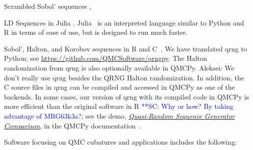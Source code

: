\documentclass[graybox,footinfo]{svmult}
\newcommand{\scnote}[1]{ {\textcolor{blue}  {\mbox{**SC:} #1}}}
\newcommand{\AGSComment}[1]{{\color{cyan} Aleksei: #1}}
\begin{document}
\begin{description}[format=\textup,format=\textbf]
	\item[PyTorch] Scrambled Sobol' sequences \cite{PyTorch},
	\item[QMC.jl] LD Sequences in Julia \cite{Rob20a}. Julia~\cite{bezanson2012julia} is an interpreted language similar to Python and R in terms of ease of use, but is designed to run much faster.
	\item [qrng] Sobol', Halton, and Korobov sequences in R and C~\cite{QRNG2020}. We have translated qrng to Python; see  \url{https://github.com/QMCSoftware/qrngpy}. The Halton randomization from qrng is also optionally available in QMCPy. \AGSComment{We don't really use qrng besides the QRNG Halton randomization.} In addition, the C source files in qrng can be compiled and accessed in QMCPy as one of the backends. In some cases, our version of qrng with its compiled code in QMCPy is more efficient than the original software in R \scnote{Why or how? By taking advantage of MRG63k3a?}; see the demo, \href{https://qmcpy.readthedocs.io/en/latest/demo_rst/quasirandom_generators.html}{\emph{Quasi-Random Sequence Generator Comparison}}, in the QMCPy documentation~\cite{QMCPyDocs}. 
\end{description}
Software focusing on QMC cubatures and applications includes the following:
\end{document}
